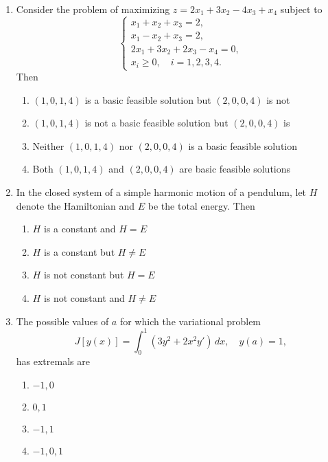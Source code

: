 \documentclass[journal]{IEEEtran}
\numberwithin{equation}{enumi}
\numberwithin{figure}{enumi}
\begin{document}
\begin{enumerate}
\item
Consider the problem of maximizing $z = 2x_1 + 3x_2 - 4x_3 + x_4$ subject to
\[
\begin{cases}
x_1 + x_2 + x_3 = 2, \\
x_1 - x_2 + x_3 = 2, \\
2x_1 + 3x_2 + 2x_3 - x_4 = 0, \\
x_i \geq 0, \quad i=1,2,3,4.
\end{cases}
\]
Then
\hfill{}
\begin{multicols}{2}
\begin{enumerate}
    \item $(1,0,1,4)$ is a basic feasible solution but $(2,0,0,4)$ is not
    \item $(1,0,1,4)$ is not a basic feasible solution but $(2,0,0,4)$ is
    \item Neither $(1,0,1,4)$ nor $(2,0,0,4)$ is a basic feasible solution
    \item Both $(1,0,1,4)$ and $(2,0,0,4)$ are basic feasible solutions
\end{enumerate}
\end{multicols}

\item
In the closed system of a simple harmonic motion of a pendulum, let $H$ denote the Hamiltonian and $E$ be the total energy. Then
\hfill{}
\begin{multicols}{2}
\begin{enumerate}
    \item $H$ is a constant and $H = E$
    \item $H$ is a constant but $H \neq E$
    \item $H$ is not constant but $H = E$
    \item $H$ is not constant and $H \neq E$
\end{enumerate}
\end{multicols}

\item
The possible values of $a$ for which the variational problem
\[
J[y(x)] = \int_0^1 (3y^2 + 2x^2 y')\, dx, \quad y(a) = 1,
\]
has extremals are
\hfill{}
\begin{multicols}{4}
\begin{enumerate}
    \item $-1, 0$
    \item $0, 1$
    \item $-1, 1$
    \item $-1, 0, 1$
\end{enumerate}
\end{multicols}


\end{enumerate}
\end{document}
